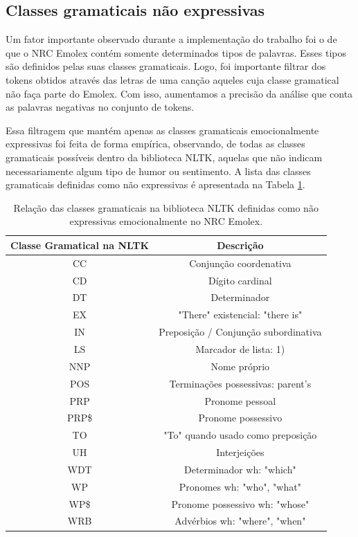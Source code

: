 \subsection{Classes gramaticais não expressivas} \label{subsec:pos}

Um fator importante observado durante a implementação do trabalho foi o de
que o NRC Emolex contém somente determinados tipos de palavras. Esses tipos
são definidos pelas suas classes gramaticais. Logo, foi importante filtrar
dos tokens obtidos através das letras de uma canção aqueles cuja classe
gramatical não faça parte do Emolex. Com isso, aumentamos a precisão da 
análise que conta as palavras negativas no conjunto de tokens. 

Essa filtragem que mantém apenas as classes gramaticais emocionalmente
expressivas foi feita de forma empírica, observando, de todas as classes
gramaticais possíveis dentro da biblioteca NLTK, aquelas que não indicam
necessariamente algum tipo de humor ou sentimento. A lista das classes
gramaticais definidas como não expressivas é apresentada na Tabela
\ref{tab:nonexppos}.

\begin{table}[h]
	\centering
	\begin{tabular}{|c|c|}
		\hline
		\textbf{Classe Gramatical na NLTK} & \textbf{Descrição} \\ \hline
		CC & Conjunção coordenativa \\ \hline
		CD & Dígito cardinal \\ \hline
		DT & Determinador \\ \hline
		EX & "There" existencial: "there is" \\ \hline
		IN & Preposição / Conjunção subordinativa \\ \hline
		LS & Marcador de lista: 1) \\ \hline
		NNP & Nome próprio \\ \hline
		POS & Terminações possessivas: parent's \\ \hline
		PRP & Pronome pessoal \\ \hline
		PRP\$ & Pronome possessivo \\ \hline
		TO & "To" quando usado como preposição \\ \hline
		UH & Interjeições \\ \hline
		WDT & Determinador wh: "which" \\ \hline
		WP & Pronomes wh: "who", "what" \\ \hline
		WP\$ & Pronome possessivo wh: "whose" \\ \hline
		WRB & Advérbios wh: "where", "when" \\ \hline
	\end{tabular}
	\caption{\label{tab:nonexppos} Relação das classes gramaticais na
	biblioteca NLTK definidas como não expressivas emocionalmente no
	NRC Emolex.}
\end{table}

